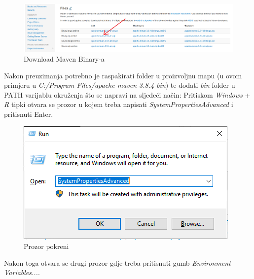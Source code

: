 			\begin{figure}[H]
			\centering
			\includegraphics[width=\textwidth, scale=0.5]{slike/mavenDownload}
			\caption{Download Maven Binary-a}
			\label{fig:mavenDownload}
			\end{figure}
			
			\eject
			Nakon preuzimanja potrebno je raspakirati folder u proizvoljnu mapu (u ovom primjeru u \textit{C:/Program Files/apache-maven-3.8.4-bin}) te dodati \textit{bin} folder u PATH varijablu okruženja što se napravi na sljedeći način: 
			Pritiskom \textit{Windows} + \textit{R} tipki otvara se prozor u kojem treba napisati \textit{SystemPropertiesAdvanced} i pritisnuti Enter.
			
			\begin{figure}[H]
			\centering
			\includegraphics[width=\textwidth, scale=0.5]{slike/RunWindow}
			\caption{Prozor pokreni}
			\label{fig:RunWindow}
			\end{figure}
		
		\eject
			Nakon toga otvara se drugi prozor gdje treba pritisnuti gumb \textit{Environment Variables...}.
			
